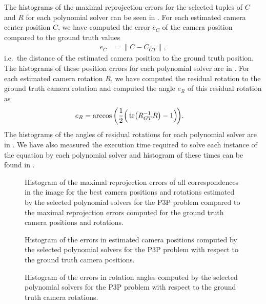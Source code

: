 The histograms of the maximal reprojection errors for the selected tuples of $C$ and $R$ for each polynomial solver can be seen in .
For each estimated camera center position $C$, we have computed the error $e_C$ of the camera position compared to the ground truth values
\begin{align}
  e_C &= \|C-C_{GT}\|,
\end{align}
i.e.\ the distance of the estimated camera position to the ground truth position.
The histograms of these position errors for each polynomial solver are in .
For each estimated camera rotation $R$, we have computed the residual rotation to the ground truth camera rotation and computed the angle $e_R$ of this residual rotation as
\begin{align}
  e_R &= \arccos\bigg(\frac{1}{2}\Big(\operatorname{tr}\!\big(R_{GT}^{-1}R\big)-1\Big)\!\bigg).
\end{align}
The histograms of the angles of residual rotations for each polynomial solver are in .
We have also measured the execution time required to solve each instance of the equation  by each polynomial solver and histogram of these times can be found in .

\begin{figure}[ht]
  \centering
  \resizebox{0.95\textwidth}{!}{}
  \caption{Histogram of the maximal reprojection errors of all correspondences in the image for the best camera positions and rotations estimated by the selected polynomial solvers for the P3P problem compared to the maximal reprojection errors computed for the ground truth camera positions and rotations.}
\end{figure}

\begin{figure}[ht]
  \centering
  \resizebox{0.95\textwidth}{!}{}
  \caption{Histogram of the errors in estimated camera positions computed by the selected polynomial solvers for the P3P problem with respect to the ground truth camera positions.}
\end{figure}

\begin{figure}[ht]
  \centering
  \resizebox{0.95\textwidth}{!}{}
  \caption{Histogram of the errors in rotation angles computed by the selected polynomial solvers for the P3P problem with respect to the ground truth camera rotations.}
\end{figure}

